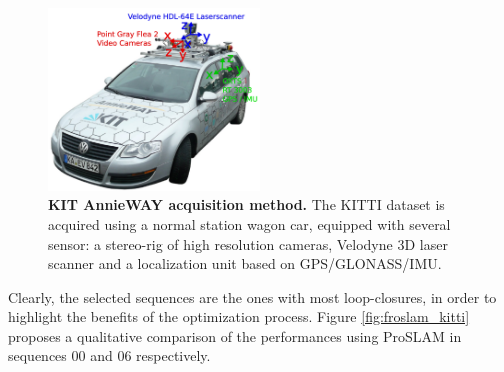 \begin{figure}[!htb]
    \centering
    \includegraphics[width=0.5\textwidth]{figures/06_use_cases/kitti_setup.png}
    \caption{\textbf{KIT AnnieWAY acquisition method.} The KITTI dataset is acquired using a normal station wagon car, equipped with several sensor: a stereo-rig of high resolution cameras, Velodyne 3D laser scanner and a localization unit based on GPS/GLONASS/IMU.}
    \label{fig:kit_annieway}
\end{figure}

Clearly, the selected sequences are the ones with most loop-closures, in order to highlight the benefits of the optimization process. Figure \ref{fig:froslam_kitti} proposes a qualitative comparison of the performances using ProSLAM in sequences 00 and 06 respectively. 

